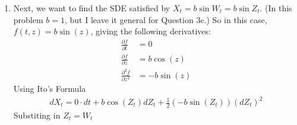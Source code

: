 \documentclass[12pt]{article}
\theoremstyle{plain}
\theoremstyle{definition}
\theoremstyle{remark}
\begin{document}
\begin{enumerate}
\begin{enumerate}
      \item %
        Next, we want to find the SDE satisfied by $X_t = b \sin W_t = b \sin
        Z_t$. (In this problem $b=1$, but I leave it general for
        Question 3c.) So in this case, $f(t,z) = b\sin(z)$, giving the
        following derivatives:
        \begin{align*}
          \frac{\partial f}{\partial t} &= 0 \\
          \frac{\partial f}{\partial z} &= b\cos(z) \\
          \frac{\partial^2 f}{\partial z^2} &= -b\sin(z)
        \end{align*}
        Using Ito's Formula
        \begin{align*}
          dX_t = 0 \cdot dt + b \cos(Z_t) dZ_t
          + \frac{1}{2} \left(-b \sin(Z_t)\right) (dZ_t)^2
        \end{align*}
        Substiting in $Z_t = W_t$



\end{enumerate}
\end{enumerate}
\end{document}
